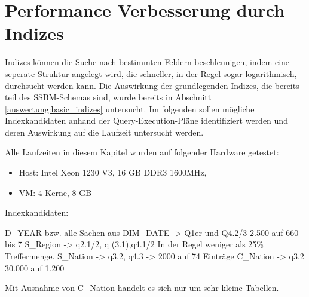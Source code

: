 \chapter{Performance Verbesserung durch Indizes}

Indizes können die Suche nach bestimmten Feldern beschleunigen, indem eine seperate Struktur angelegt wird, die schneller, in der Regel sogar logarithmisch, durchsucht werden kann.
Die Auswirkung der grundlegenden Indizes, die bereits teil des SSBM-Schemas sind, wurde bereits in Abschnitt \ref{auswertung:basic_indizes} untersucht. 
Im folgenden sollen mögliche Indexkandidaten anhand der Query-Execution-Pläne identifiziert werden und deren Auswirkung auf die Laufzeit untersucht werden.

Alle Laufzeiten in diesem Kapitel wurden auf folgender Hardware getestet:
\begin{itemize}
    \item Host: Intel Xeon 1230 V3, 16 GB DDR3 1600MHz, 
    \item VM: 4 Kerne, 8 GB
\end{itemize}

Indexkandidaten:

D_YEAR bzw. alle Sachen aus DIM_DATE -> Q1er und Q4.2/3 2.500 auf 660 bis 7
S_Region -> q2.1/2, q (3.1),q4.1/2 In der Regel weniger als 25\% Treffermenge.
S_Nation -> q3.2, q4.3 -> 2000 auf 74 Einträge
C_Nation -> q3.2 30.000 auf 1.200

Mit Ausnahme von C_Nation handelt es sich nur um sehr kleine Tabellen.




